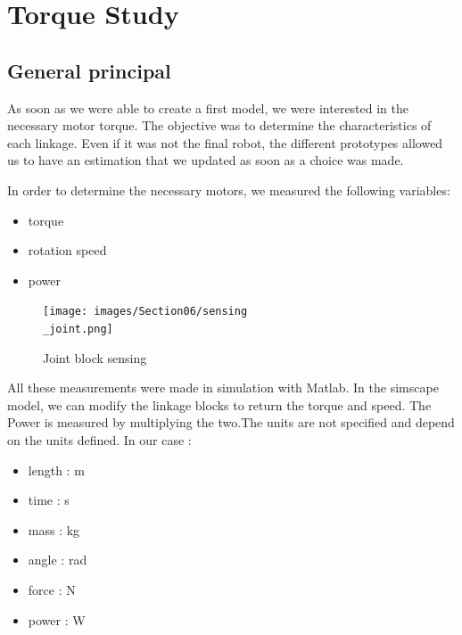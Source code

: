 \section{Torque Study}\insertloftspace
\setcounter{figure}{0}\setcounter{table}{0}

\subsection{General principal}

As soon as we were able to create a first model, we were interested in the necessary motor torque. The objective was to determine the characteristics of each linkage. Even if it was not the final robot, the different prototypes allowed us to have an estimation that we updated as soon as a choice was made. 

\bigbreak
In order to determine the necessary motors, we measured the following variables:
\begin{multicols}{3}
    \begin{itemize}[noitemsep]
        \item torque
        \item rotation speed
        \item power
    \end{itemize}
\end{multicols}

\bigbreak
\begin{figure}[ht]
    \centering
    \texttt{[image: images/Section06/sensing\\\_joint.png]}
    \caption{Joint block sensing}
    \label{fig:mesh15}
\end{figure}
\FloatBarrier

\bigbreak
All these measurements were made in simulation with Matlab. In the simscape model, we can modify the linkage blocks to return the torque and speed. The Power is measured by multiplying the two.The units are not specified and depend on the units defined. In our case : 
\begin{multicols}{2}
    \begin{itemize}[noitemsep]
        \item length : m
        \item time : s
        \item mass : kg
        \item angle : rad
        \item force : N
        \item power : W
    \end{itemize}
\end{multicols}

